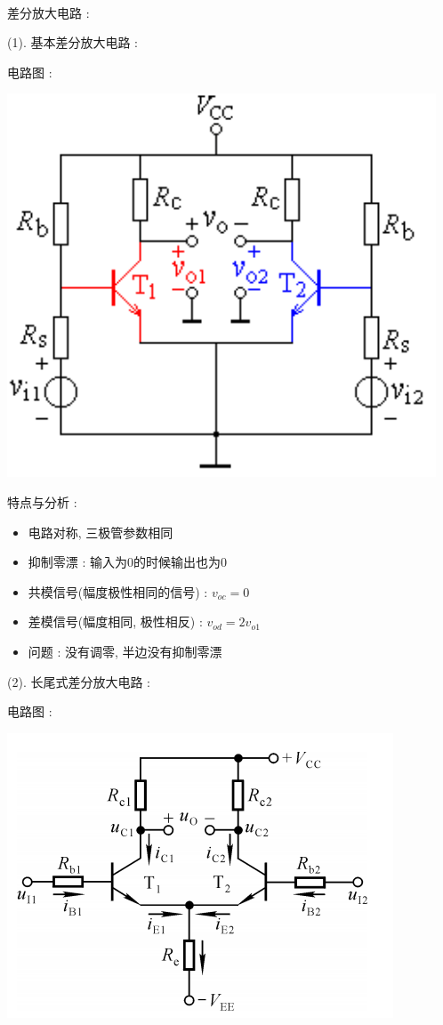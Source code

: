 \documentclass[UTF8, 12pt]{ctexart}
\begin{document}
	~

	\noindent
	差分放大电路 :

	(1). 基本差分放大电路 :

	电路图 :

	\includegraphics[scale = 0.4]{03/基本差分放大电路电路图.png}

	特点与分析 :
	\begin{itemize}[leftmargin = 4em]
		\item 电路对称, 三极管参数相同
		\item 抑制零漂 : 输入为0的时候输出也为0
		\item 共模信号(幅度极性相同的信号) : $ v_{oc} = 0 $
		\item 差模信号(幅度相同, 极性相反) : $ v_{od} = 2v_{o1} $
		\item 问题 : 没有调零, 半边没有抑制零漂
	\end{itemize}

	(2). 长尾式差分放大电路 :

	电路图 :

	\includegraphics[scale = 0.4]{03/长尾式差分放大电路电路图.png}
\end{document}
